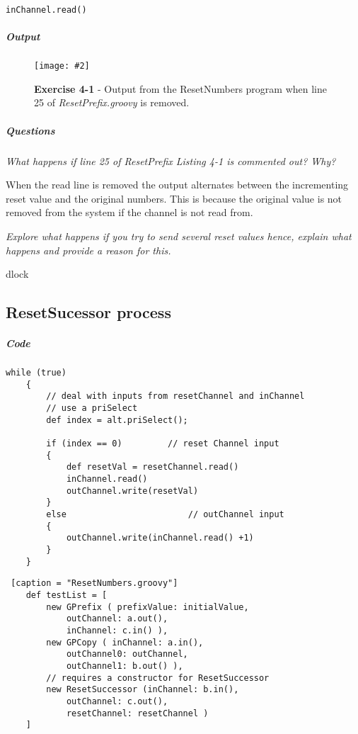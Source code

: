 \documentclass[10pt, a4paper]{article}
\newcommand{\figuremacro}[5]{
    \begin{figure}[#1]
        \centering
        \texttt{[image: \#2]}
        \caption[#3]{\textbf{#3}#4}
        \label{fig:#2}
    \end{figure}
}
\begin{document}
	\begin{lstlisting}[caption = "Line 25 of ResetPrefix.groovy"]
		inChannel.read()	\end{lstlisting}
		
	\subparagraph{Output} \hfill
	
	\figuremacro{H}{resetNum}{Exercise 4-1}{ - Output from the ResetNumbers program when line 25 of \textit{ResetPrefix.groovy} is removed.}{0.5}
	
	\subparagraph{Questions} \hfill
	
	\textit{What happens if line {25} of ResetPrefix Listing 4-1 is commented out? Why?}
	
	When the read line is removed the output alternates between the incrementing reset value and the original numbers. This is because
	the original value is not removed from the system if the channel is not read from.
		
	\textit{Explore what happens if you try to send several reset values hence, explain what happens and provide a reason for this.}
	
	
	dlock
	
	\subsection{ResetSucessor process}

	\subparagraph{Code} \hfil
	
	
	\begin{lstlisting}[caption = "ResetSucessor.groovy"]
	while (true)
	{
		// deal with inputs from resetChannel and inChannel
		// use a priSelect
		def index = alt.priSelect();
		
		if (index == 0) 		// reset Channel input
		{
			def resetVal = resetChannel.read()
			inChannel.read()
			outChannel.write(resetVal)
		}
		else						// outChannel input
		{
			outChannel.write(inChannel.read() +1)				
		}
	}	\end{lstlisting}
	
	\begin{lstlisting} [caption = "ResetNumbers.groovy"]
	def testList = [
		new GPrefix ( prefixValue: initialValue, 
			outChannel: a.out(), 
			inChannel: c.in() ),
		new GPCopy ( inChannel: a.in(), 
			outChannel0: outChannel, 
			outChannel1: b.out() ),
		// requires a constructor for ResetSuccessor
		new ResetSuccessor (inChannel: b.in(),
			outChannel: c.out(),
			resetChannel: resetChannel )
	]	\end{lstlisting}
	
\end{document}
